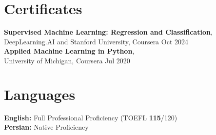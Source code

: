 \documentclass[a4paper,10pt]{article}
\newcommand{\resumeItem}[1]{\item #1}
\newcommand{\resumeSubheading}[4]{
    \textbf{#1} \hfill #2 \\
    \textit{#3} \hfill \textit{#4}
}
\begin{document}






\section*{Certificates}

\textbf{Supervised Machine Learning: Regression and Classification},\\
DeepLearning.AI and Stanford University, Coursera 
\hfill Oct 2024 \\
\textbf{Applied Machine Learning in Python},\\
University of Michigan, Coursera 
\hfill Jul 2020


\section*{Languages}

\textbf{English:} Full Professional Proficiency (TOEFL \textbf{115}/120) \\
\textbf{Persian:} Native Proficiency
\end{document}
